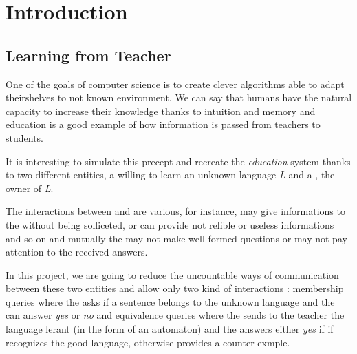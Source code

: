 \section{Introduction}

\subsection{Learning from Teacher}


One of the goals of computer science is to create clever algorithms able to adapt theirshelves to not known environment. We can say that humans have the natural capacity to increase their knowledge thanks to intuition and memory and education is a good example of how information is passed from teachers to students.

It is interesting to simulate this precept and recreate the \textit{education} system thanks to two different entities, a \learner{} willing to learn an unknown language \textit{L} and a \teacher{}, the owner of \textit{L}.

The interactions between \learner{} and \teacher{} are various, for instance, \teacher{} may give informations to the \learner{} without being solliceted, or can provide not relible or useless informations and so on and mutually the \learner{} may not make well-formed questions or may not pay attention to the received answers.

In this project, we are going to reduce the uncountable ways of communication between these two entities and allow only two kind of interactions : membership queries where the \learner{} asks if a sentence belongs to the unknown language and the \teacher{} can answer \textit{yes} or \textit{no} and
equivalence queries where the \learner{} sends to the teacher the language lerant (in the form of an automaton) and the \teacher{} answers either \textit{yes} if if recognizes the good language, otherwise provides a counter-exmple.

